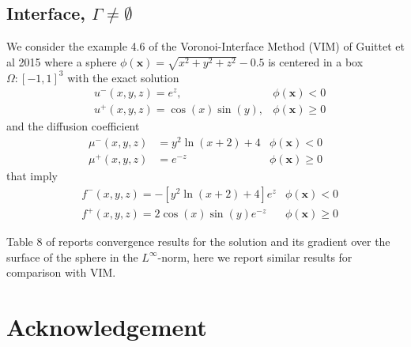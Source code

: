 \documentclass{elsarticle}
\begin{document}
\subsection{Interface, $\Gamma\neq \emptyset$}
We consider the example 4.6 of the Voronoi-Interface Method (VIM) of Guittet et al 2015 \cite{guittet2015solving} where a sphere $\phi(\mathbf{x})=\sqrt{x^2 + y^2 + z^2} - 0.5$ is centered in a box $\Omega:[-1,1]^3$ with the exact solution
\begin{align*}
& u^-(x,y,z)=e^{z}, & \phi(\mathbf{x})<0\\
& u^+(x,y,z)=\cos(x)\sin(y), & \phi(\mathbf{x})\ge 0
\end{align*}
and the diffusion coefficient
\begin{align*}
\mu^-(x,y,z)&=y^2 \ln(x+2) + 4 &\phi(\mathbf{x})<0 \\
\mu^+(x,y,z)&=e^{-z} &\phi(\mathbf{x})\ge 0 
\end{align*}
that imply
\begin{align*}
&f^-(x,y,z)=-[y^2\ln(x+2) + 4] e^{z} &\phi(\mathbf{x})< 0\\
&f^+(x,y,z)=2\cos(x)\sin(y)e^{-z} &\phi(\mathbf{x})\ge 0
\end{align*}

Table 8 of \cite{guittet2015solving} reports convergence results for the solution and its gradient over the surface of the sphere in the $L^\infty$-norm, here we report similar results for comparison with VIM.

\section*{Acknowledgement}



\newpage


\end{document}
